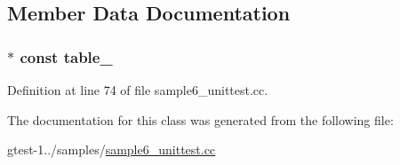 \subsection{\-Member \-Data \-Documentation}
\hypertarget{classPrimeTableTest_a121125d1a512b0b272909d1a84c3819b}{
\subsubsection[{table\-\_\-}]{$\ast$ const {\bf table\-\_\-}}}\label{d3/d08/classPrimeTableTest_a121125d1a512b0b272909d1a84c3819b}


\-Definition at line 74 of file sample6\-\_\-unittest.\-cc.



\-The documentation for this class was generated from the following file\-:\begin{DoxyCompactItemize}
\item 
gtest-\/1../samples/\hyperlink{sample6__unittest_8cc}{sample6\-\_\-unittest.\-cc}\end{DoxyCompactItemize}

